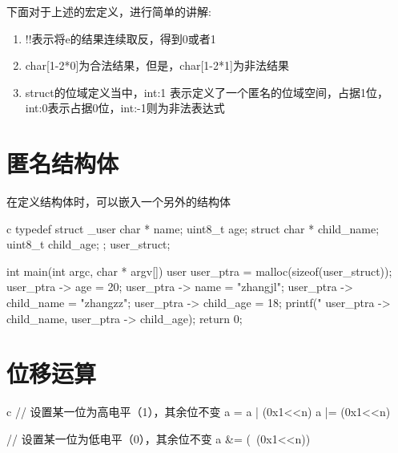 \begin{outline}[enumerate]
下面对于上述的宏定义，进行简单的讲解:
\begin{enumerate}
  \item !!表示将e的结果连续取反，得到0或者1
  \item char[1-2*0]为合法结果，但是，char[1-2*1]为非法结果
  \item struct的位域定义当中，int:1 表示定义了一个匿名的位域空间，占据1位，int:0表示占据0位，int:-1则为非法表达式
\end{enumerate}

\end{outline}

\section{匿名结构体}
在定义结构体时，可以嵌入一个另外的结构体
\begin{code-block}{c}
typedef struct _user {
    char * name;
    uint8_t age;
    struct {
        char * child_name;
        uint8_t child_age;
    };
}user_struct;

int main(int argc, char * argv[])
{
    user user_ptra = malloc(sizeof(user_struct));
    user_ptra -> age = 20;
    user_ptra -> name = "zhangjl";
    user_ptra -> child_name = "zhangzz";
    user_ptra -> child_age = 18;
    printf("%
           user_ptra -> child_name, user_ptra -> child_age);
    return 0;
}
\end{code-block}

\section{位移运算}
\begin{code-block}{c}
// 设置某一位为高电平（1），其余位不变
a = a | (0x1<<n)
a |= (0x1<<n)

// 设置某一位为低电平（0），其余位不变
a &= (~(0x1<<n))
\end{code-block}
